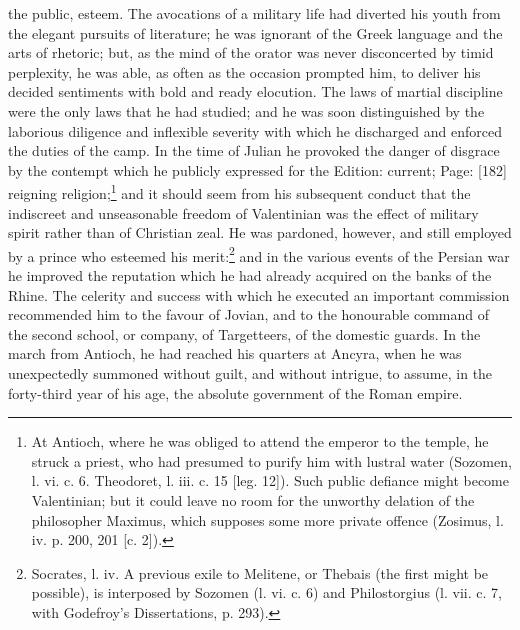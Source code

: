the public, esteem. The avocations of a military life had diverted his youth from the elegant pursuits of literature; he was ignorant of the Greek language and the arts of rhetoric; but, as the mind of the orator was never disconcerted by timid perplexity, he was able, as often as the occasion prompted him, to deliver his decided sentiments with bold and ready elocution. The laws of martial discipline were the only laws that he had studied; and he was soon distinguished by the laborious diligence and inflexible severity with which he discharged and enforced the duties of the camp. In the time of Julian he provoked the danger of disgrace by the contempt which he publicly expressed for the Edition: current; Page: [182] reigning religion;\footnote{At Antioch, where he was obliged to attend the emperor to the temple, he struck a priest, who had presumed to purify him with lustral water (Sozomen, l. vi. c. 6. Theodoret, l. iii. c. 15 [leg. 12]). Such public defiance might become Valentinian; but it could leave no room for the unworthy delation of the philosopher Maximus, which supposes some more private offence (Zosimus, l. iv. p. 200, 201 [c. 2]).} and it should seem from his subsequent conduct that the indiscreet and unseasonable freedom of Valentinian was the effect of military spirit rather than of Christian zeal. He was pardoned, however, and still employed by a prince who esteemed his merit:\footnote{Socrates, l. iv. A previous exile to Melitene, or Thebais (the first might be possible), is interposed by Sozomen (l. vi. c. 6) and Philostorgius (l. vii. c. 7, with Godefroy\texthebrew{}’s Dissertations, p. 293).} and in the various events of the Persian war he improved the reputation which he had already acquired on the banks of the Rhine. The celerity and success with which he executed an important commission recommended him to the favour of Jovian, and to the honourable command of the second school, or company, of Targetteers, of the domestic guards. In the march from Antioch, he had reached his quarters at Ancyra, when he was unexpectedly summoned without guilt, and without intrigue, to assume, in the forty-third year of his age, the absolute government of the Roman empire.

